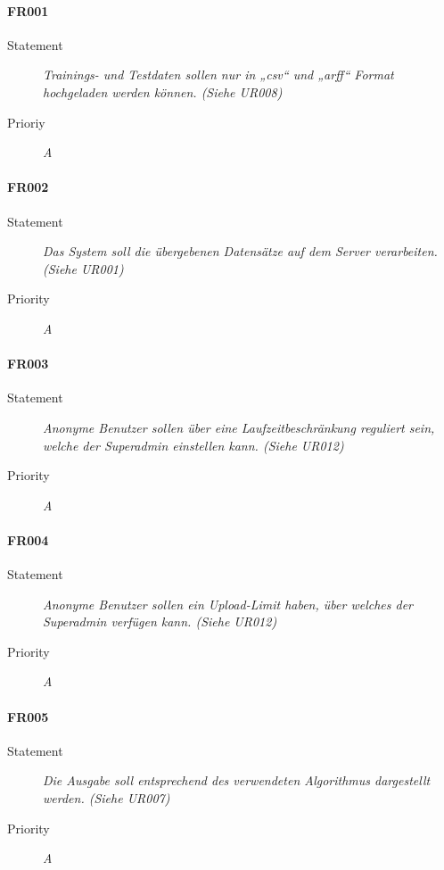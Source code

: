 \paragraph{FR001}
\begin{description}
  \item [Statement]
    \textit{Trainings- und Testdaten sollen nur in „\gls{csv}“ und „\gls{arff}“ Format hochgeladen werden können.
    (Siehe UR008)}
  \item [Prioriy] \textit{A}
\end{description}

\paragraph{FR002}
\begin{description}
  \item [Statement] 
    \textit{Das System soll die übergebenen Datensätze auf dem Server verarbeiten.
    (Siehe UR001)}
  \item [Priority] \textit{A}
\end{description}

\paragraph{FR003}
\begin{description}
  \item [Statement] 
    \textit{Anonyme Benutzer sollen über eine Laufzeitbeschränkung reguliert sein, welche der \gls{Superadmin} einstellen kann.
    (Siehe UR012)}
  \item [Priority] \textit{A}
\end{description}

\paragraph{FR004}
\begin{description}
  \item [Statement] 
    \textit{Anonyme Benutzer sollen ein Upload-Limit haben, über welches der \gls{Superadmin} verfügen kann.
    (Siehe UR012)}
  \item [Priority] \textit{A}
\end{description}

\paragraph{FR005}
\begin{description}
  \item [Statement] 
    \textit{Die Ausgabe soll entsprechend des verwendeten Algorithmus dargestellt werden.
    (Siehe UR007)}
  \item [Priority] \textit{A}
\end{description}

